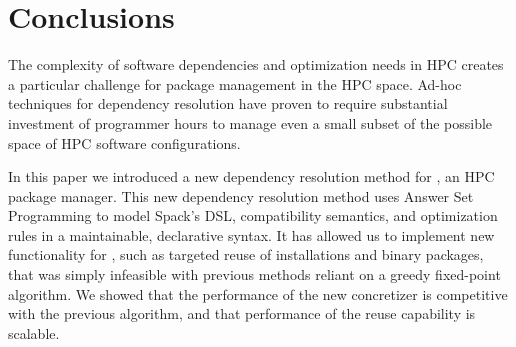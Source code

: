 \section{Conclusions}
\label{sec:conclusions}

The complexity of software dependencies and optimization needs in HPC creates a
particular challenge for package management in the HPC space. Ad-hoc techniques for
dependency resolution have proven to require substantial investment of programmer hours
to manage even a small subset of the possible space of HPC software configurations.

In this paper we introduced a new dependency resolution method for \spack{}, an HPC
package manager. This new dependency resolution method uses Answer Set Programming to
model Spack's DSL, compatibility semantics, and optimization rules in a maintainable,
declarative syntax. It has allowed us to implement new functionality for \spack{}, such
as targeted reuse of installations and binary packages, that was simply infeasible with
previous methods reliant on a greedy fixed-point algorithm.
%
We showed that the performance of the new concretizer is competitive with
the previous algorithm, and that performance of the reuse capability is scalable.

